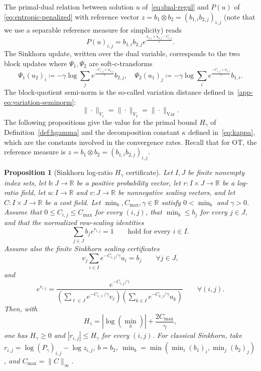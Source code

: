\documentclass{article}
\theoremstyle{plain}
\newtheorem{proposition}{Proposition}[section]
\newcommand{\RR}{\mathbb{R}}
\newcommand{\norm}[1]{\|#1\|}
\newcommand{\normVar}[1]{\norm{#1}_{\mathrm{Var}}}
\newcommand{\z}{z}
\begin{document}
%
The primal-dual relation between solution $u$ of~\eqref{eq:dual-regul} and $P(u)$ of \eqref{eq:entropic-penalized} with reference vector $\z = b_1 \otimes b_2 =( b_{1,i} b_{2,j} )_{i,j}$ (note that we use a separable reference measure for simplicity) reads 
$$
	P(u)_{i,j} = b_{1,i} b_{2,j} e^{ \frac{u_{1,i} + u_{2,j} - C_{i,j} }{\gamma} }. 
$$
The Sinkhorn update, written over the dual variable, corresponds to the two block updates where $\Psi_1, \Psi_2$ are soft-c-transforms 
\begin{equation}\label{app-eq:soft-c-transform}
	\Psi_1(u_2)_i  \coloneqq  - \gamma \log \sum_j  e^{ \frac{-C_{i,j} + u_{2,j} }{\gamma} } b_{2,j}  ,  
	\quad 
	\Psi_2(u_1)_j  \coloneqq  - \gamma \log \sum_i   e^{ \frac{-C_{i,j} + u_{1,i}}{\gamma} } b_{1,i} .
\end{equation}
The block-quotient semi-norm is the so-called variation distance defined in~\eqref{app-eq:variation-seminorm}:
$$
	\norm{\cdot}_{V_1} = \norm{\cdot}_{V_2} = \normVar{\cdot}. 
$$
The following propositions give the value for the primal bound $H_\gamma$ of Definition~\ref{def:hgamma} and the decomposition constant $\kappa$ defined in~\eqref{eq:kappa}, which are the constants involved in the convergence rates.
Recall that for OT, the reference measure is $\z = b_1 \otimes b_2 = (b_{1,i} b_{2,j})_{i,j}$.

\begin{proposition}[Sinkhorn log-ratio $H_\gamma$ certificate]\label{app-prop:hgamma-ot}
Let $I,J$ be finite nonempty index sets, let $b:J\to\RR$ be a positive
probability vector, let $r:I\times J\to\RR$ be a log-ratio field, let $u:I\to\RR$ and
$v:J\to\RR$ be nonnegative scaling vectors, and let
$C:I\times J\to\RR$ be a cost field.
Let $\min_b,C_{\max},\gamma\in\RR$ satisfy $0<\min_b$ and \(\gamma>0\).
Assume that \(0\le C_{i,j}\le C_{\max}\) for every \((i,j)\), that
\(\min_b\le b_j\) for every \(j\in J\), and that the normalized row-scaling
identities
\[
  \sum_{j\in J} b_j e^{r_{i,j}}=1
  \qquad\text{hold for every } i\in I.
\]
Assume also the finite Sinkhorn scaling certificates
\[
  v_j\sum_{i\in I}e^{-C_{i,j}/\gamma}u_i=b_j
  \qquad\forall j\in J,
\]
and
\[
  e^{r_{i,j}}
  =
  \frac{e^{-C_{i,j}/\gamma}}
  {\left(\sum_{\ell\in J}e^{-C_{i,\ell}/\gamma}v_\ell\right)
   \left(\sum_{k\in I}e^{-C_{k,j}/\gamma}u_k\right)}
  \qquad\forall(i,j).
\]
Then, with
\[
  H_\gamma=|\log(\min_b)|+\frac{2C_{\max}}{\gamma},
\]
one has $H_\gamma\ge0$ and $|r_{i,j}|\le H_\gamma$ for every $(i,j)$.
For classical Sinkhorn, take
$r_{i,j}=\log(P_\gamma)_{i,j}-\log z_{i,j}$,
$b=b_2$, $\min_b=\min(\min_i(b_1)_i,\min_j(b_2)_j)$, and
$C_{\max}=\|C\|_\infty$.
\end{proposition}
\end{document}
